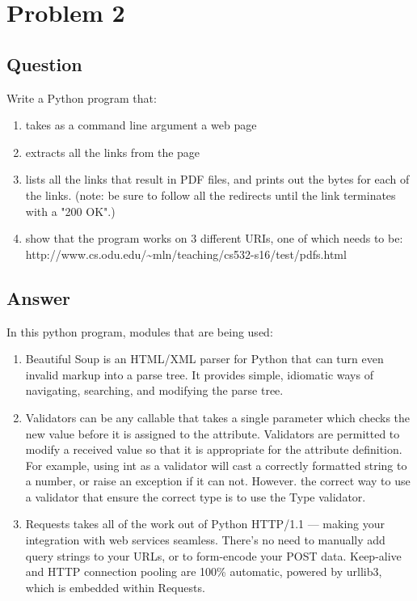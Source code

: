 \section{Problem 2}
\label{problem2}
\subsection{Question}
\vspace*{10pt}
Write a Python program that:
\begin{enumerate}
\item takes as a command line argument a web page
\item extracts all the links from the page
\item lists all the links that result in PDF files, and prints out
      the bytes for each of the links.  (note: be sure to follow
      all the redirects until the link terminates with a "200 OK".)
\item show that the program works on 3 different URIs, one of which
needs to be:\\
http://www.cs.odu.edu/\~{}mln/teaching/cs532-s16/test/pdfs.html
\end{enumerate}
 
\subsection{Answer}
\vspace*{5mm}
In this python program, modules that are being used: 
\begin{enumerate}
\item Beautiful Soup is an HTML/XML parser for Python that can turn even invalid markup into a parse tree. It provides simple, idiomatic ways of navigating, searching, and modifying the parse tree.\cite{bs4} 
\\
\item Validators can be any callable that takes a single parameter which checks the new value before it is assigned to the attribute. Validators are permitted to modify a received value so that it is appropriate for the attribute definition. For example, using int as a validator will cast a correctly formatted string to a number, or raise an exception if it can not. However. the correct way to use a validator that ensure the correct type is to use the Type validator.\cite{validators}
\\
\item Requests takes all of the work out of Python HTTP/1.1 — making your integration with web services seamless. There’s no need to manually add query strings to your URLs, or to form-encode your POST data. Keep-alive and HTTP connection pooling are 100\% automatic, powered by urllib3, which is embedded within Requests.\cite{requests}
\end{enumerate}

